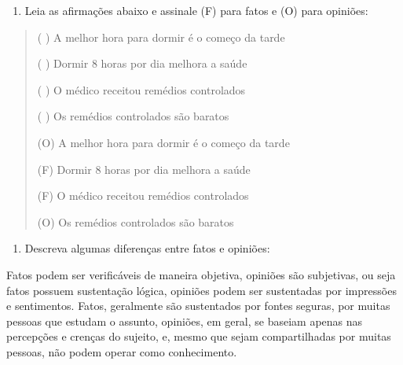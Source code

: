 {


\begin{enumerate}
\def\labelenumi{\arabic{enumi})}
\tightlist
\item
  Leia as afirmações abaixo e assinale (F) para fatos e (O) para
  opiniões:
\end{enumerate}

\begin{quote}
( ) A melhor hora para dormir é o começo da tarde

( ) Dormir 8 horas por dia melhora a saúde

( ) O médico receitou remédios controlados

( ) Os remédios controlados são baratos

(O) A melhor hora para dormir é o começo da tarde

(F) Dormir 8 horas por dia melhora a saúde

(F) O médico receitou remédios controlados

(O) Os remédios controlados são baratos
\end{quote}

\begin{enumerate}
\def\labelenumi{\arabic{enumi})}
\setcounter{enumi}{1}
\tightlist
\item
  Descreva algumas diferenças entre fatos e opiniões:
\end{enumerate}

Fatos podem ser verificáveis de maneira objetiva, opiniões são
subjetivas, ou seja fatos possuem sustentação lógica, opiniões podem ser
sustentadas por impressões e sentimentos. Fatos, geralmente são
sustentados por fontes seguras, por muitas pessoas que estudam o
assunto, opiniões, em geral, se baseiam apenas nas percepções e crenças
do sujeito, e, mesmo que sejam compartilhadas por muitas pessoas, não
podem operar como conhecimento.

}
